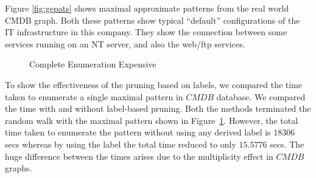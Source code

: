 \smallskip{}
Figure \ref{fig:gepats} shows maximal approximate
patterns from the real world CMDB graph. Both these patterns show
typical ``default'' 
configurations of the IT infrastructure in this company. They show the
connection between some services running on an NT server, and also the
web/ftp services.


\begin{figure}
    \centering
    \caption{Complete Enumeration Expensive}
    \label{fig:geex}
\end{figure}

To show the effectiveness of the pruning based on labels, we compared
the time taken to enumerate a single maximal pattern in $CMDB$ database.
We compared the time with and without label-based pruning.
Both the methods terminated the random walk with the maximal pattern
shown in Figure~\ref{fig:geex}.  
However, the total time taken to enumerate the pattern
without using any derived label is $18306$ secs whereas by using the
\combined label the total time reduced to only $15.5776$ secs. The huge
difference between the times arises due to the multiplicity effect in
$CMDB$ graphs.  



